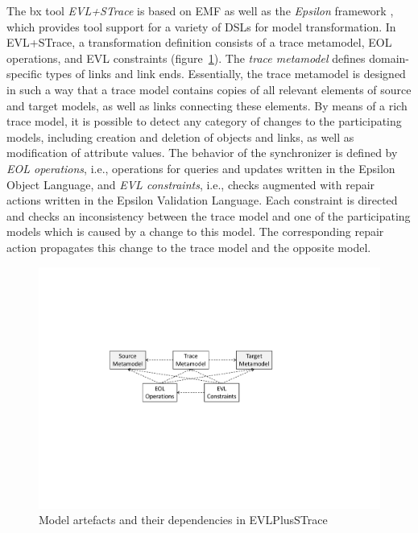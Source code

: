 The bx tool \emph{EVL+STrace} \cite{IST2018-Samimi} is based on EMF as well as the \emph{Epsilon} framework \cite{epsilon}, which provides tool support for a variety of DSLs for model transformation. In EVL+STrace, a transformation definition consists of a trace metamodel, EOL operations, and EVL constraints (figure~\ref{fig:evlartefacts}). The \emph{trace metamodel} defines domain-specific types of links and link ends. Essentially, the trace metamodel is designed in such a way that a trace model contains copies of all relevant elements of source and target models, as well as links connecting these elements. By means of a rich trace model, it is possible to detect any category of changes to the participating models, including creation and deletion of objects and links, as well as modification of attribute values. The behavior of the synchronizer is defined by \emph{EOL operations}, i.e., operations for queries and updates written in the Epsilon Object Language, and \emph{EVL constraints}, i.e., checks augmented with repair actions written in the Epsilon Validation Language. Each constraint is directed and checks an inconsistency between the trace model and one of the participating models which is caused by a change to this model. The corresponding repair action propagates this change to the trace model and the opposite model.

\begin{figure}[tb!]
	\centering
	\includegraphics[width=0.8\columnwidth]{diagrams/solutions/EVLPlusSTraceArtefacts}
	\caption{Model artefacts and their dependencies in EVLPlusSTrace}
	\label{fig:evlartefacts}
\end{figure}



